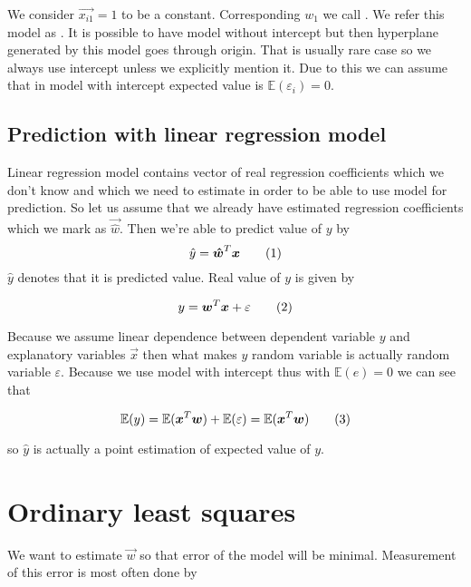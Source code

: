\begin{definition}
We consider $\vec{x_{i1}} = 1$ to be a constant. Corresponding $w_{1}$ we call . We refer this model as . It is possible to have model without intercept but then hyperplane generated by this model goes through origin. That is usually rare case so we always use intercept unless we explicitly mention it. Due to this we can assume that in model with intercept expected value is  $\mathbb{E}(\varepsilon_i) = 0$.
\end{definition}


\subsection{Prediction with linear regression model}
Linear regression model contains vector of real regression coefficients which we don't know and which we need to estimate in order to be able to use model for prediction. So let us assume that we already have estimated regression coefficients which we mark as $\vec{\hat{w}}$. Then we're able to predict value of $y$ by
\begin{equation}
    \hat{y} = \vec{\hat{w}}^T\vec{x} \numberthis
\end{equation}
$\hat{y}$ denotes that it is predicted value. Real value of $y$ is given by 

\begin{equation}
    y = \vec{w}^T\vec{x} + \varepsilon \numberthis
\end{equation}

Because we assume linear dependence between dependent variable $y$ and explanatory variables $\vec{x}$ then what makes $y$ random variable is actually random variable $\varepsilon$. Because we use model with intercept thus with $\mathbb{E}(e) = 0$ we can see that 

\begin{equation}
\mathbb{E}(y) =\mathbb{E}(\vec{x}^T\vec{w}) + \mathbb{E}(\varepsilon) = \mathbb{E}(\vec{x}^T\vec{w})
\numberthis
\end{equation}

so $\hat{y}$ is actually a point estimation of expected value of $y$.


\section{Ordinary least squares}
We want to estimate $\vec{w}$ so that error of the model will be minimal. Measurement of this error is most often done by  

